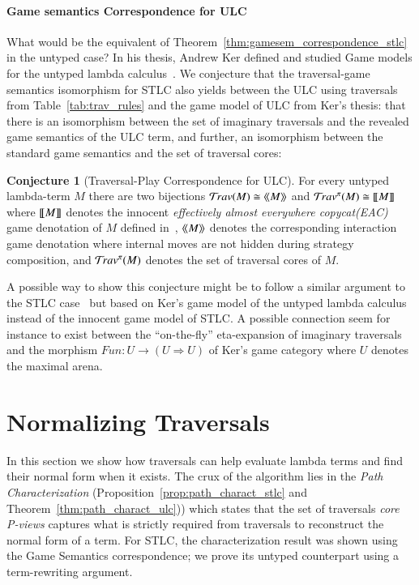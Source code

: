 \documentclass{elsarticle}
\theoremstyle{plain}
\theoremstyle{definition}
\newtheorem{conjecture}{Conjecture}[section]
\theoremstyle{remark}
\newcommand{\travulc}{\travset}
\def\coresymbol{\pi} %
\begin{document}
\paragraph{Game semantics Correspondence for ULC}
What would be the equivalent of Theorem~\ref{thm:gamesem_correspondence_stlc} in the untyped case? In his thesis, Andrew Ker defined and studied Game models for the untyped lambda calculus~\cite{KerThesis}.  We conjecture that the traversal-game semantics isomorphism for STLC also yields between the ULC using traversals from Table~\ref{tab:trav_rules} and the game model of ULC from Ker's thesis: that there is an isomorphism between the set of imaginary traversals and the revealed game semantics of the ULC term, and further, an isomorphism between the standard game semantics and the set of traversal cores:

\begin{conjecture}[Traversal-Play Correspondence for ULC]
\label{conj:ulc_corresp}
For every untyped lambda-term $M$ there are two bijections
$ \travulc(M) \cong \revsem{M}$ and
 $\travulc^\coresymbol(M) \cong \sem{M}$
where ${[\![ M ]\!]}$ denotes the innocent \emph{effectively almost everywhere copycat(EAC)} game denotation of $M$ defined in~\cite{KerThesis},
${\langle\!\langle M \rangle\!\rangle}$ denotes the corresponding interaction game denotation where internal moves are not hidden during strategy composition,
and $\travulc^\coresymbol(M)$ denotes the set of traversal cores of $M$.
\end{conjecture}
A possible way to show this conjecture might be to follow a similar argument to the STLC case~\cite{BlumPhd} but based on Ker's game model of the untyped lambda calculus instead of the innocent game model of STLC. A possible connection seem for instance to exist between the ``on-the-fly'' eta-expansion of imaginary traversals and  the morphism $Fun : U \rightarrow (U \Rightarrow U)$ of Ker's game category where $U$ denotes the maximal arena.

\section{Normalizing Traversals}

In this section we show how traversals can help evaluate lambda terms and find their normal form when it exists. The crux of the algorithm lies in the \emph{Path Characterization} (Proposition~\ref{prop:path_charact_stlc} and Theorem~\ref{thm:path_charact_ulc})) which states that the set of traversals \emph{core P-views} captures what is strictly required from traversals to reconstruct the normal form of a term.
For STLC, the characterization result was shown using the Game Semantics correspondence; we prove its untyped counterpart using a term-rewriting argument.
\end{document}
